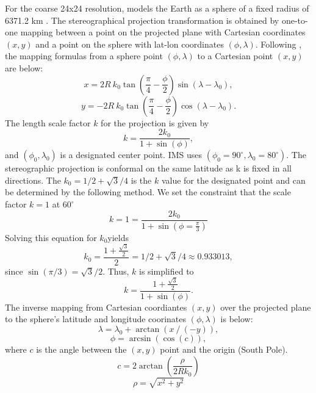 For the coarse 24x24 resolution, models the Earth as a sphere of a fixed radius of 6371.2 km \cite{NIC}. The stereographical projection transformation is obtained by one-to-one mapping between a point on the projected plane with Cartesian coordinates $(x,y)$ and a point on the sphere with lat-lon coordinates $(\phi, \lambda)$. 
 Following \cite{snyder1987map}, the mapping formulas from a sphere point $(\phi, \lambda)$ to a Cartesian point $(x,y)$  are below:
\begin{equation}
x = 2R \ k_0 \tan (\frac{\pi}{4} - \frac{\phi}{2}) \sin (\lambda - \lambda_{0} ),
\end{equation}
\begin{equation}
y = -2R \ k_0 \tan (\frac{\pi}{4} - \frac{\phi}{2})\cos(\lambda - \lambda_{0}).
\end{equation}
The length scale factor $k$ for the projection is given by
\begin{equation} \label{eq:k spherical}
k = \frac{2k_{0}}{1+\sin(\phi)},
\end{equation}
and $(\phi_0,\lambda_0)$ is a designated center point. IMS uses $(\phi_0=90^\circ, \lambda_{0} = 80^{\circ})$.  The stereographic projection is conformal on the same 
latitude as k is fixed in all directions. The $k_0=1/2 + \sqrt{3}/4$ is the $k$ value for the designated point and can be determined by the following method.  We set the constraint 
that the scale factor $k=1$ at $60^{\circ}$ 
\begin{equation}\label{eq:k one}
k = 1 = \frac{2k_{0}}{1+\sin(\phi=\frac{\pi}{3})}
\end{equation}
Solving this equation for $k_{0}$yields
\begin{equation}
k_0 = \frac{1+\frac{\sqrt{3}}{2}}{2}=1/2 + \sqrt{3}/4 \approx 0.933013,
\end{equation}
since $\sin(\pi/3) = \sqrt{3}/2$. Thus, $k$ is simplified to
\begin{equation}
k = \frac{1+\frac{\sqrt{3}}{2}}{1+\sin(\phi)}.
\end{equation}
The inverse mapping from Cartesian coordiantes $(x,y)$ over 
the projected plane to the sphere's latitude and longitude 
coorinates $(\phi, \lambda)$ is below:
\begin{equation}
\lambda = \lambda_{0} + \arctan(x \ / \ (-y)),
\end{equation}
\begin{equation}
\phi = \arcsin(\cos(c)),
\end{equation}
where $c$ is the angle between the $(x,y)$ point and the origin (South Pole).
\begin{equation}
c = 2 \arctan(\frac{\rho}{2Rk_{0}})
\end{equation}
\begin{equation}
\rho = \sqrt{x^2 + y^2}
\end{equation}

